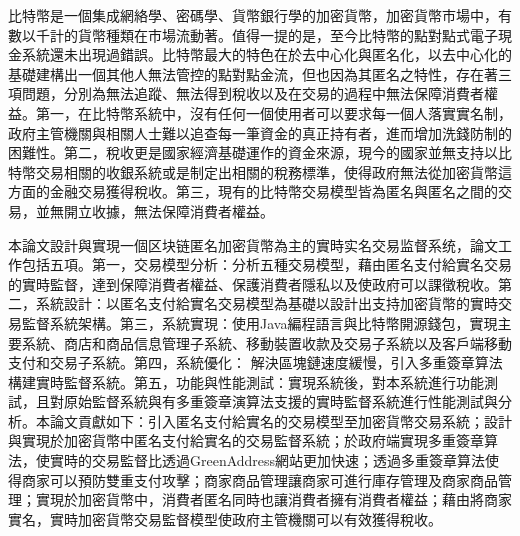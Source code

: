 
\begin{cabstract}

	比特幣是一個集成網絡學、密碼學、貨幣銀行學的加密貨幣，加密貨幣市場中，有數以千計的貨幣種類在市場流動著。值得一提的是，至今比特幣的點對點式電子現金系統還未出現過錯誤。比特幣最大的特色在於去中心化與匿名化，以去中心化的基礎建構出一個其他人無法管控的點對點金流，但也因為其匿名之特性，存在著三項問題，分別為無法追蹤、無法得到稅收以及在交易的過程中無法保障消費者權益。第一，在比特幣系統中，沒有任何一個使用者可以要求每一個人落實實名制，政府主管機關與相關人士難以追查每⼀筆資金的真正持有者，進而增加洗錢防制的困難性。第二，稅收更是國家經濟基礎運作的資金來源，現今的國家並無支持以比特幣交易相關的收銀系統或是制定出相關的稅務標準，使得政府無法從加密貨幣這方面的金融交易獲得稅收。第三，現有的比特幣交易模型皆為匿名與匿名之間的交易，並無開立收據，無法保障消費者權益。

	本論文設計與實現一個区块链匿名加密貨幣為主的實時实名交易监督系统，論文工作包括五項。第一，交易模型分析：分析五種交易模型，藉由匿名支付給實名交易的實時監督，達到保障消費者權益、保護消費者隱私以及使政府可以課徵稅收。第二，系統設計：以匿名支付給實名交易模型為基礎以設計出支持加密貨幣的實時交易監督系統架構。第三，系統實現：使用Java編程語言與比特幣開源錢包，實現主要系統、商店和商品信息管理子系統、移動裝置收款及交易子系統以及客戶端移動支付和交易子系統。第四，系統優化：
	解決區塊鏈速度緩慢，引入多重簽章算法構建實時監督系統。第五，功能與性能測試：實現系統後，對本系統進行功能測試，且對原始監督系統與有多重簽章演算法支援的實時監督系統進行性能測試與分析。本論文貢獻如下：引入匿名支付給實名的交易模型至加密貨幣交易系統；設計與實現於加密貨幣中匿名支付給實名的交易監督系統；於政府端實現多重簽章算法，使實時的交易監督比透過GreenAddress網站更加快速；透過多重簽章算法使得商家可以預防雙重支付攻擊；商家商品管理讓商家可進行庫存管理及商家商品管理；實現於加密貨幣中，消費者匿名同時也讓消費者擁有消費者權益；藉由將商家實名，實時加密貨幣交易監督模型使政府主管機關可以有效獲得稅收。



\end{cabstract}

